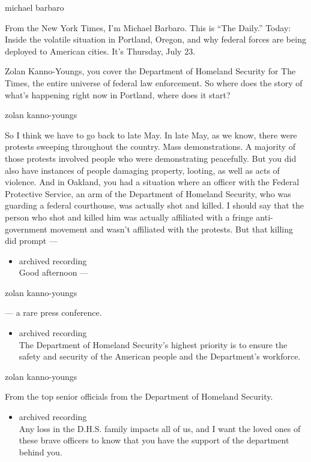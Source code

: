 michael barbaro

From the New York Times, I'm Michael Barbaro. This is ``The Daily.''
Today: Inside the volatile situation in Portland, Oregon, and why
federal forces are being deployed to American cities. It's Thursday,
July 23.

Zolan Kanno-Youngs, you cover the Department of Homeland Security for
The Times, the entire universe of federal law enforcement. So where does
the story of what's happening right now in Portland, where does it
start?

zolan kanno-youngs

So I think we have to go back to late May. In late May, as we know,
there were protests sweeping throughout the country. Mass
demonstrations. A majority of those protests involved people who were
demonstrating peacefully. But you did also have instances of people
damaging property, looting, as well as acts of violence. And in Oakland,
you had a situation where an officer with the Federal Protective
Service, an arm of the Department of Homeland Security, who was guarding
a federal courthouse, was actually shot and killed. I should say that
the person who shot and killed him was actually affiliated with a fringe
anti-government movement and wasn't affiliated with the protests. But
that killing did prompt ---

\begin{itemize}
\tightlist
\item
  archived recording\\
  Good afternoon ---
\end{itemize}

zolan kanno-youngs

--- a rare press conference.

\begin{itemize}
\tightlist
\item
  archived recording\\
  The Department of Homeland Security's highest priority is to ensure
  the safety and security of the American people and the Department's
  workforce.
\end{itemize}

zolan kanno-youngs

From the top senior officials from the Department of Homeland Security.

\begin{itemize}
\tightlist
\item
  archived recording\\
  Any loss in the D.H.S. family impacts all of us, and I want the loved
  ones of these brave officers to know that you have the support of the
  department behind you.
\end{itemize}

